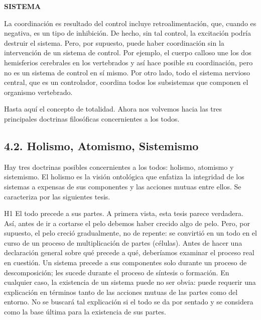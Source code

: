 \newpage
\fancyhf{}
\fancyhead[r]{\thepage}
\begin{center}
{\fontsize{16}{18}\selectfont \textbf{SISTEMA}}
\end{center}
\vspace{0.5cm}

{\fontsize{13}{15}\selectfont
La coordinación es resultado del control incluye retroalimentación, que, cuando es negativa, es un tipo de inhibición. De hecho, sin tal control, la excitación podría destruir el sistema. 
Pero, por supuesto, puede haber coordinación sin la intervención de un sistema de control. Por ejemplo, el cuerpo calloso une los dos hemisferios cerebrales en los vertebrados y así hace posible su coordinación, pero no es un sistema de control en sí mismo. 
Por otro lado, todo el sistema nervioso central, que es un controlador, coordina todos los subsistemas que componen el organismo vertebrado.

Hasta aquí el concepto de totalidad. Ahora nos volvemos hacia las tres principales doctrinas filosóficas concernientes a los todos.

\subsection* {4.2. Holismo, Atomismo, Sistemismo}

Hay tres doctrinas posibles concernientes a los todos: holismo, atomismo y sistemismo. El holismo es la visión ontológica que enfatiza la integridad de los sistemas a expensas de sus componentes y las acciones mutuas entre ellos. 
Se caracteriza por las siguientes tesis.

H1 El todo precede a sus partes. A primera vista, esta tesis parece verdadera. Así, antes de ir a cortarse el pelo debemos haber crecido algo de pelo. 
Pero, por supuesto, el pelo creció gradualmente, no de repente: se convirtió en un todo en el curso de un proceso de multiplicación de partes (células). Antes de hacer una declaración general sobre qué precede a qué, deberíamos examinar el proceso real en cuestión. 
Un sistema precede a sus componentes solo durante un proceso de descomposición; les sucede durante el proceso de síntesis o formación. En cualquier caso, la existencia de un sistema puede no ser obvia: puede requerir una explicación en términos tanto de las acciones mutuas de las partes como del entorno. No se buscará tal explicación si el todo se da por sentado y se considera como la base última para la existencia de sus partes.

}
